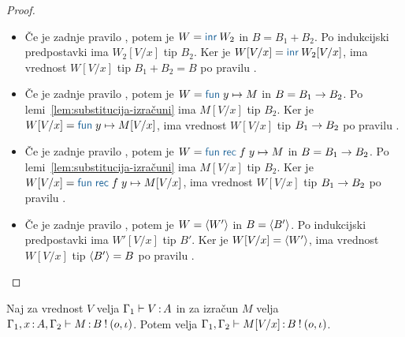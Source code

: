 \begin{proof}
\begin{itemize}
		\item Če je zadnje pravilo , potem je $W = \tminr{W_2}$ in $B = B_1 + B_2$. Po indukcijski predpostavki ima $W_2[V/x]$ tip $B_2$.
		Ker je $W[V/x] = \tminr{W_2[V/x]}$, ima vrednost $W[V/x]$ tip $B_1 + B_2 = B$ po pravilu .
		
		\item Če je zadnje pravilo , potem je $W = \tmfunano{y}{M}$ in $B = B_1 \to B_2$. Po lemi~\ref{lem:substitucija-izračuni} ima $M[V/x]$ tip $B_2$.
		Ker je $W[V/x] = \tmfunano{y}{M[V/x]}$, ima vrednost $W[V/x]$ tip $B_1 \to B_2$ po pravilu .
		
		\item Če je zadnje pravilo , potem je $W = \tmfunrecano{f}{y}{M}$ in $B = B_1 \to B_2$. Po lemi~\ref{lem:substitucija-izračuni} ima $M[V/x]$ tip $B_2$.
		Ker je $W[V/x] = \tmfunrecano{f}{y}{M[V/x]}$, ima vrednost $W[V/x]$ tip $B_1 \to B_2$ po pravilu .
		
		\item Če je zadnje pravilo , potem je $W = \langle W' \rangle$ in $B = \langle B' \rangle$. Po indukcijski predpostavki ima $W'[V/x]$ tip $B'$.
		Ker je $W[V/x] = \langle W' \rangle$, ima vrednost $W[V/x]$ tip $\langle B' \rangle = B$ po pravilu .
	\end{itemize}
\end{proof}


\begin{lema}\label{lem:substitucija-izračuni}
	Naj za vrednost $V$ velja $\Gamma_1 \vdash V \mathinner{:} A$ in za izračun $M$ velja $\Gamma_1, x \mathinner{:} A, \Gamma_2 \vdash M \mathinner{:} B \mathbin{!} (o, \iota)$. Potem velja $\Gamma_1, \Gamma_2 \vdash M[V/x] \mathinner{:} B \mathbin{!} (o, \iota)$.
\end{lema}

